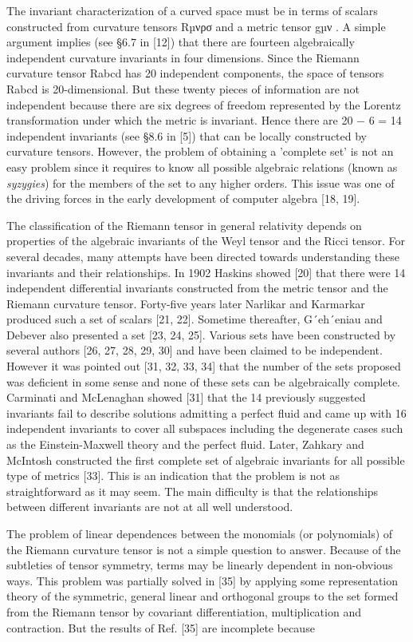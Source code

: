 \documentclass{article}
\begin{document}
The invariant characterization of a curved space must be in terms of scalars constructed from curvature tensors Rµνρσ and a metric tensor gµν . A simple argument implies (see §6.7 in [12]) that there are fourteen algebraically independent curvature invariants in four dimensions. Since the Riemann curvature tensor Rabcd has 20 independent components, the space of tensors Rabcd is 20-dimensional. But these twenty pieces of information are not independent because there are six degrees of freedom represented by the Lorentz transformation under which the metric is invariant. Hence there are 20 − 6 = 14 independent invariants (see §8.6 in [5]) that can be locally constructed by curvature tensors. However, the problem of obtaining a 'complete set' is not an easy problem since it requires to know all possible algebraic relations (known as \textit{syzygies}) for the members of the set to any higher orders. This issue was one of the driving forces in the early development of computer algebra [18, 19].

The classification of the Riemann tensor in general relativity depends on properties of the algebraic invariants of the Weyl tensor and the Ricci tensor. For several decades, many attempts have been directed towards understanding these invariants and their relationships. In 1902 Haskins showed [20] that there were 14 independent differential invariants constructed from the metric tensor and the Riemann curvature tensor. Forty-five years later Narlikar and Karmarkar produced such a set of scalars [21, 22]. Sometime thereafter, G´eh´eniau and Debever also presented a set [23, 24, 25]. Various sets have been constructed by several authors [26, 27, 28, 29, 30] and have been claimed to be independent. However it was pointed out [31, 32, 33, 34] that the number of the sets proposed was deficient in some sense and none of these sets can be algebraically complete. Carminati and McLenaghan showed [31] that the 14 previously suggested invariants fail to describe solutions admitting a perfect fluid and came up with 16 independent invariants to cover all subspaces including the degenerate cases such as the Einstein-Maxwell theory and the perfect fluid. Later, Zahkary and McIntosh constructed the first complete set of algebraic invariants for all possible type of metrics [33]. This is an indication that the problem is not as straightforward as it may seem. The main difficulty is that the relationships between different invariants are not at all well understood.

The problem of linear dependences between the monomials (or polynomials) of the Riemann curvature tensor is not a simple question to answer. Because of the subtleties of tensor symmetry, terms may be linearly dependent in non-obvious ways. This problem was partially solved in [35] by applying some representation theory of the symmetric, general linear and orthogonal groups to the set formed from the Riemann tensor by covariant differentiation, multiplication and contraction. But the results of Ref. [35] are incomplete because
\end{document}
